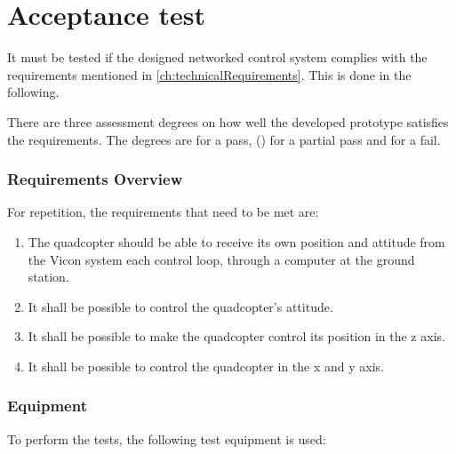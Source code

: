 \chapter{Acceptance test}

It must be tested if the designed networked control system complies with the requirements mentioned in \autoref{ch:technicalRequirements}. This is done in the following. %

There are three assessment degrees on how well the developed prototype satisfies the requirements. The degrees are  for a pass, () for a partial pass and  for a fail. 

\subsection*{Requirements Overview}
For repetition, the requirements that need to be met are:
\begin{enumerate}[label=\textbf{\arabic*})]
\item {The quadcopter should be able to receive its own position and attitude from the Vicon system each control loop, through a computer at the ground station.}
\item {It shall be possible to control the quadcopter's attitude.}
\item {It shall be possible to make the quadcopter control its position in the z axis.}
\item {It shall be possible to control the quadcopter in the x and y axis.}
\end{enumerate}

\newpage
\subsection*{Equipment}
To perform the tests, the following test equipment is used:
\begin{table}[H] \centering
{}
\caption{Test equipment used for the acceptance test.}
\label{tab:test_equipment}
\end{table}

